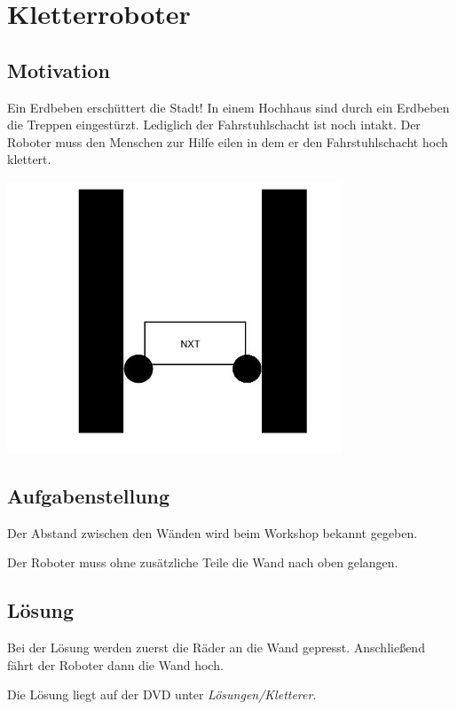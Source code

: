 \chapter{Kletterroboter}
\section{Motivation}
Ein Erdbeben erschüttert die Stadt! In einem Hochhaus sind durch ein Erdbeben die Treppen eingestürzt. Lediglich der Fahrstuhlschacht ist noch intakt. Der Roboter muss den Menschen zur Hilfe eilen in dem er den Fahrstuhlschacht hoch klettert.

\begin{capfigure}[Kletterroboter]
	\includegraphics[width=10cm]{images/klettern_skizze}
\end{capfigure}

\section{Aufgabenstellung}
Der Abstand zwischen den Wänden wird beim Workshop bekannt gegeben.

Der Roboter muss ohne zusätzliche Teile die Wand nach oben gelangen.
\section{Lösung}
Bei der Lösung werden zuerst die Räder an die Wand gepresst. Anschließend fährt der Roboter dann die Wand hoch.

Die Lösung liegt auf der DVD unter \textit{Lösungen/Kletterer}. 